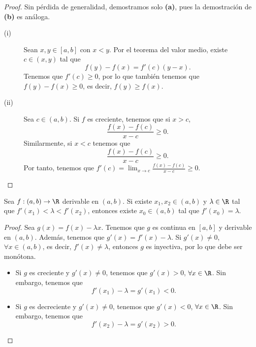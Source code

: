 \begin{proof} Sin pérdida de generalidad, demostramos solo \textbf{(a)}, pues la demostración de \textbf{(b)} es análoga.
\begin{description}
	\item[(i)] Sean $\displaystyle x,y \in [a,b] $ con $\displaystyle x < y $. Por el teorema del valor medio, existe $\displaystyle c \in \left(x,y\right) $ tal que 
		\[ f\left(y\right)-f\left(x\right) = f'\left(c\right)\left(y-x\right) .\]
		Tenemos que $\displaystyle f'\left(c\right) \geq0 $, por lo que también tenemos que $\displaystyle f\left(y\right)-f\left(x\right) \geq 0  $, es decir, $\displaystyle f\left(y\right) \geq f\left(x\right) $.
	\item[(ii)] Sea $\displaystyle c \in \left(a,b\right) $. Si $\displaystyle f $ es creciente, tenemos que si $\displaystyle x > c $, 
		\[ \frac{f\left(x\right)-f\left(c\right)}{x-c} \geq 0 .\]
		Similarmente, si $\displaystyle x < c $ tenemos que 
		\[ \frac{f\left(x\right)-f\left(c\right)}{x-c} \geq 0 .\]
	Por tanto, tenemos que $\displaystyle f'\left(c\right) = \lim_{x \to c}\frac{f\left(x\right)-f\left(c\right)}{x-c} \geq 0 $.
\end{description}
\end{proof}
\begin{ftheorem}[]
\normalfont Sea $\displaystyle f : \left(a,b\right) \to \R $ derivable en $\displaystyle \left(a,b\right) $. Si existe $\displaystyle x_{1}, x_{2} \in \left(a,b\right) $ y $\displaystyle \lambda \in \R $ tal que $\displaystyle f'\left(x_{1}\right) < \lambda < f'\left(x_{2}\right) $, entonces existe $\displaystyle x_{0} \in \left(a,b\right) $ tal que $\displaystyle f'\left(x_{0}\right) = \lambda  $.
\end{ftheorem}
\begin{proof}
	Sea $\displaystyle g\left(x\right) = f\left(x\right)-\lambda x $. Tenemos que $\displaystyle g $ es continua en $\displaystyle [a,b] $ y derivable en $\displaystyle \left(a,b\right) $. Además, tenemos que $\displaystyle g'\left(x\right) = f'\left(x\right) - \lambda  $. Si $\displaystyle g'\left(x\right) \neq 0  $, $\displaystyle \forall x \in \left(a,b\right) $, es decir, $\displaystyle f'\left(x\right) \neq \lambda  $, entonces $\displaystyle g $ es inyectiva, por lo que debe ser monótona.
\begin{itemize}
\item Si $\displaystyle g $ es creciente y $\displaystyle g'\left(x\right) \neq 0 $, tenemos que $\displaystyle g'\left(x\right) > 0 $, $\displaystyle \forall x \in \R $. Sin embargo, tenemos que 
	\[ f'\left(x_{1}\right)-\lambda = g'\left(x_{1}\right) < 0 .\]
\item Si $\displaystyle g $ es decreciente y $\displaystyle g'\left(x\right) \neq 0 $, tenemos que $\displaystyle g'\left(x\right) < 0 $, $\displaystyle \forall x \in \R $. Sin embargo, tenemos que
	\[ f'\left(x_{2}\right) - \lambda = g'\left(x_{2}\right) > 0 .\] 
\end{itemize}
\end{proof}
